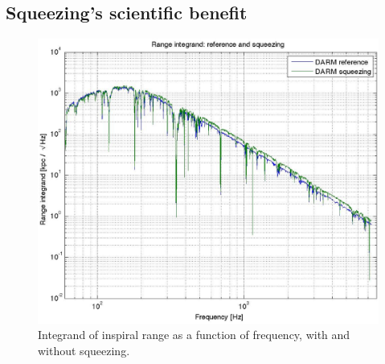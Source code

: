 
\subsection{Squeezing's scientific benefit}


\begin{figure}
\begin{center}
\includegraphics[height=0.5\paperheight, width=0.5\paperwidth,keepaspectratio]{range_integrand.eps}
\caption{Integrand of inspiral range as a function of frequency, with and without squeezing.}
\end{center}
\end{figure}
